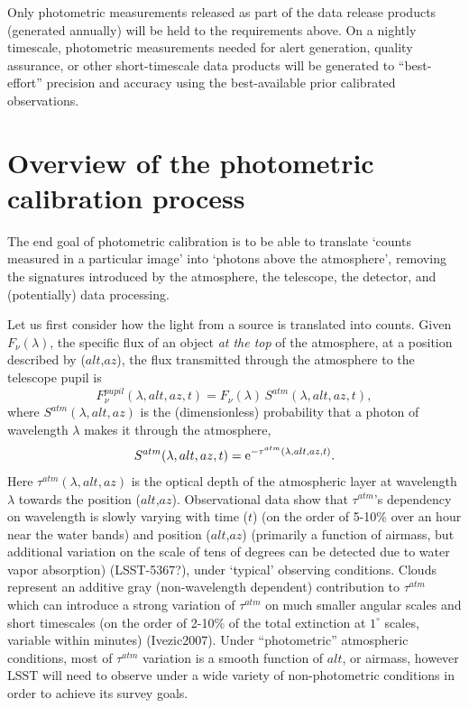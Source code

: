 \documentclass[12pt,preprint]{aastex}
\begin{document}
Only photometric measurements released as part of the data release
products (generated annually) will be held to the requirements
above. On a nightly timescale, photometric measurements needed for
alert generation, quality assurance, or other short-timescale data
products will be generated to ``best-effort'' precision and accuracy
using the best-available prior calibrated observations.

\section{Overview of the photometric calibration process}

The end goal of photometric calibration is to be able to translate
`counts measured in a particular image' into `photons above the
atmosphere', removing the signatures introduced by the atmosphere, the
telescope, the detector, and (potentially) data processing.

Let us first consider how the light from a source is translated into
counts. Given $F_\nu(\lambda)$, the specific flux of an object {\it at
the top} of the atmosphere, at a position described by ($alt$,$az$), 
the flux transmitted through the atmosphere to the telescope pupil is
\begin{equation}
\label{eqn:Fpupil}
                      F_\nu^{pupil}(\lambda,alt,az,t) = F_\nu(\lambda) \, S^{atm}(\lambda,alt,az,t),
\end{equation}
where $S^{atm}(\lambda,alt,az)$ is the (dimensionless) probability that a photon of 
wavelength $\lambda$ makes it through the atmosphere,
\begin{equation}
\label{eqn:atmTau}
                        S^{atm}(\lambda,alt,az,t)   = {\rm e}^{-\tau^{atm}(\lambda,alt,az,t)}.
\end{equation}
Here $\tau^{atm}(\lambda,alt,az)$ is the optical depth of the
atmospheric layer at wavelength $\lambda$ towards the position
($alt$,$az$).  Observational data show that $\tau^{atm}$'s dependency
on wavelength is slowly varying with time ($t$) (on the order of
5-10\% over an hour near the water bands) and position ($alt$,$az$)
(primarily a function of airmass, but additional variation on the
scale of tens of degrees can be detected due to water vapor
absorption) (LSST-5367?), under `typical' observing conditions.  
Clouds represent an additive gray (non-wavelength dependent)
contribution to $\tau^{atm}$ which can introduce a strong variation of
$\tau^{atm}$ on much smaller angular scales and short timescales (on
the order of 2-10\% of the total extinction at $1^{\circ}$ scales,
variable within minutes) (Ivezic2007). Under ``photometric''
atmospheric conditions, most of $\tau^{atm}$ variation is a smooth
function of $alt$, or airmass, however LSST will need to observe under
a wide variety of non-photometric conditions in order to achieve its
survey goals.
\end{document}
